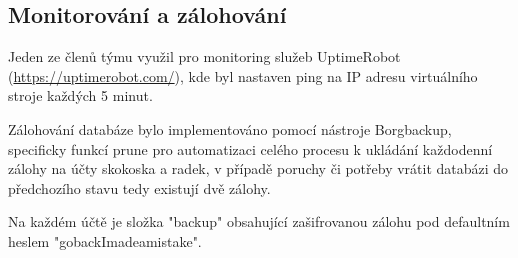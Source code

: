 \subsection{Monitorování a zálohování}
Jeden ze členů týmu využil pro monitoring služeb UptimeRobot (\href{https://uptimerobot.com/}{https://uptimerobot.com/}), kde byl nastaven ping na IP adresu virtuálního stroje každých 5 minut.

Zálohování databáze bylo implementováno pomocí nástroje Borgbackup, specificky funkcí prune pro automatizaci celého procesu k ukládání každodenní zálohy na účty skokoska a radek, v případě poruchy či potřeby vrátit databázi do předchozího stavu tedy existují dvě zálohy.

Na každém účtě je složka "backup" obsahující zašifrovanou zálohu pod defaultním heslem "gobackImadeamistake".